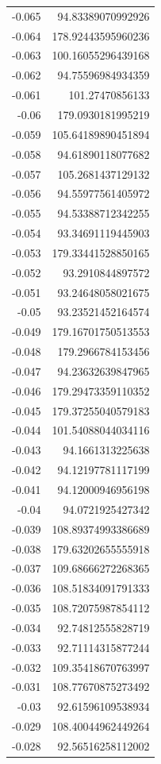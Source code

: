 \documentclass{mimosis}
\begin{document}
\begin{longtable}{rr}
-0.065 & 94.83389070992926\\
-0.064 & 178.92443595960236\\
-0.063 & 100.16055296439168\\
-0.062 & 94.75596984934359\\
-0.061 & 101.27470856133\\
-0.06 & 179.0930181995219\\
-0.059 & 105.64189890451894\\
-0.058 & 94.61890118077682\\
-0.057 & 105.2681437129132\\
-0.056 & 94.55977561405972\\
-0.055 & 94.53388712342255\\
-0.054 & 93.34691119445903\\
-0.053 & 179.33441528850165\\
-0.052 & 93.2910844897572\\
-0.051 & 93.24648058021675\\
-0.05 & 93.23521452164574\\
-0.049 & 179.16701750513553\\
-0.048 & 179.2966784153456\\
-0.047 & 94.23632639847965\\
-0.046 & 179.29473359110352\\
-0.045 & 179.37255040579183\\
-0.044 & 101.54088044034116\\
-0.043 & 94.1661313225638\\
-0.042 & 94.12197781117199\\
-0.041 & 94.12000946956198\\
-0.04 & 94.0721925427342\\
-0.039 & 108.89374993386689\\
-0.038 & 179.63202655555918\\
-0.037 & 109.68666272268365\\
-0.036 & 108.51834091791333\\
-0.035 & 108.72075987854112\\
-0.034 & 92.74812555828719\\
-0.033 & 92.71114315877244\\
-0.032 & 109.35418670763997\\
-0.031 & 108.77670875273492\\
-0.03 & 92.61596109538934\\
-0.029 & 108.40044962449264\\
-0.028 & 92.56516258112002\\

\end{longtable}
\end{document}

